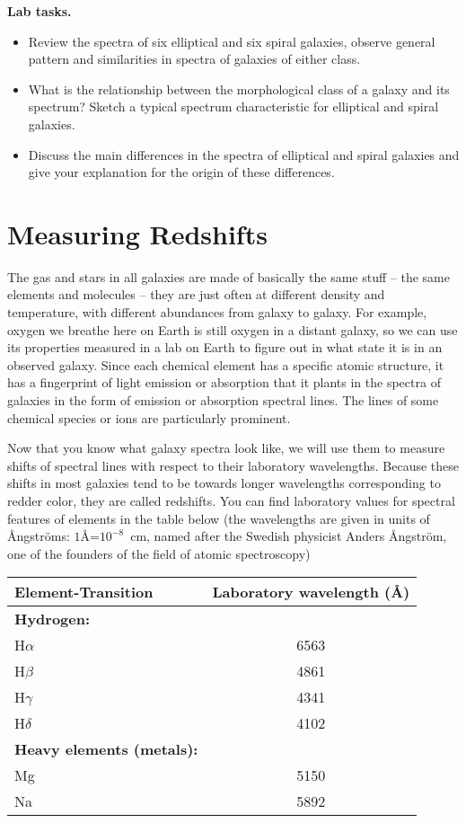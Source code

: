 \documentclass[12pt]{article}
\begin{document}
{\bf Lab tasks.}
{\it \begin{itemize}
\item  Review the spectra of six elliptical and six
spiral galaxies, observe general pattern and similarities in spectra of galaxies of either class.
\item What is the relationship between the morphological class of a galaxy and its spectrum?
 Sketch a typical spectrum characteristic for elliptical and spiral galaxies. 
\item Discuss the main differences in the spectra of elliptical and spiral galaxies and give your 
explanation for the origin of these differences. 
\end{itemize}
}

\section*{Measuring Redshifts}


The gas and stars in all galaxies are made of basically the
same stuff -- the same elements and molecules -- they are just often at different density 
and temperature, with different
abundances from galaxy to galaxy. For example, oxygen we breathe here on Earth is still oxygen in a
distant galaxy, so we can use its properties measured in a lab on Earth to figure out
in what state it is in an observed galaxy. Since each chemical element has a
specific atomic structure, it has a fingerprint of light emission or
absorption that it plants in the spectra of galaxies in the form of emission or absorption spectral lines.
The lines of some chemical species or ions are particularly 
prominent.

 Now that you know what galaxy spectra look like, we will use them to measure
shifts of spectral lines with respect to their laboratory wavelengths. Because these shifts in most galaxies tend 
to be towards longer wavelengths corresponding to redder color, they are called redshifts. You
can find laboratory values for spectral features of elements in the
table below (the wavelengths are given in units of {\AA}ngstr\"oms: $1$\AA=$10^{-8}$~cm, named after the Swedish 
physicist Anders {\AA}ngstr\"om, one of the founders of the field of atomic spectroscopy)

\begin{center}
\begin{tabular}{lc}
\hline
Element-Transition & Laboratory wavelength (\AA) \\ 
\hline
\textbf{Hydrogen:} & \\
H$\alpha$ & 6563 \\ 
H$\beta$  & 4861 \\ 
H$\gamma$  & 4341 \\ 
H$\delta$  & 4102\\
\hline
\textbf{Heavy elements (metals):} & \\
Mg & 5150 \\ 
Na  & 5892 \\
\hline
\end{tabular}
\end{center}
\end{document}
